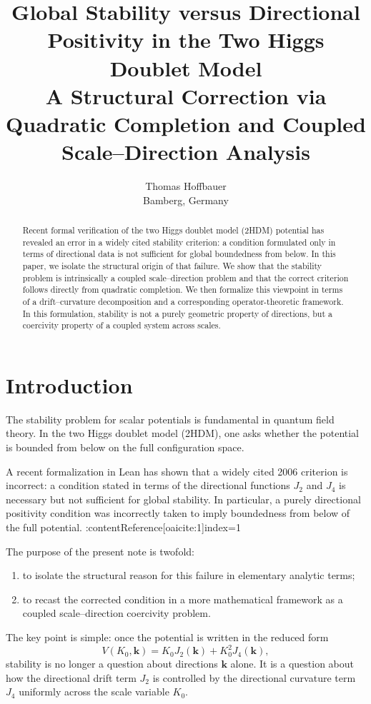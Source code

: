 \documentclass[11pt,a4paper]{article}
\title{
	Global Stability versus Directional Positivity in the Two Higgs Doublet Model\\
	\large A Structural Correction via Quadratic Completion and Coupled Scale--Direction Analysis
}
\author{
	Thomas Hoffbauer\\
	\small Bamberg, Germany
}
\date{}
\newcommand{\kk}{\bm{k}}
\begin{document}
	
	\maketitle
	
	\begin{abstract}
		Recent formal verification of the two Higgs doublet model (2HDM) potential has revealed an error in a widely cited stability criterion: a condition formulated only in terms of directional data is not sufficient for global boundedness from below. In this paper, we isolate the structural origin of that failure. We show that the stability problem is intrinsically a coupled scale--direction problem and that the correct criterion follows directly from quadratic completion. We then formalize this viewpoint in terms of a drift--curvature decomposition and a corresponding operator-theoretic framework. In this formulation, stability is not a purely geometric property of directions, but a coercivity property of a coupled system across scales.
	\end{abstract}
	
	\section{Introduction}
	
	The stability problem for scalar potentials is fundamental in quantum field theory. In the two Higgs doublet model (2HDM), one asks whether the potential is bounded from below on the full configuration space.
	
	A recent formalization in Lean has shown that a widely cited 2006 criterion is incorrect: a condition stated in terms of the directional functions \(J_2\) and \(J_4\) is necessary but not sufficient for global stability. In particular, a purely directional positivity condition was incorrectly taken to imply boundedness from below of the full potential. :contentReference[oaicite:1]{index=1}
	
	The purpose of the present note is twofold:
	\begin{enumerate}
		\item to isolate the structural reason for this failure in elementary analytic terms;
		\item to recast the corrected condition in a more mathematical framework as a coupled scale--direction coercivity problem.
	\end{enumerate}
	
	The key point is simple: once the potential is written in the reduced form
	\[
	V(K_0,\kk)=K_0J_2(\kk)+K_0^2J_4(\kk),
	\]
	stability is no longer a question about directions \(\kk\) alone. It is a question about how the directional drift term \(J_2\) is controlled by the directional curvature term \(J_4\) uniformly across the scale variable \(K_0\).
	
\end{document}
